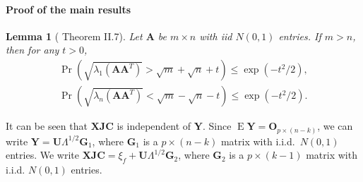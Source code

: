 \documentclass[12pt]{article} %
\DeclareMathOperator{\myE}{E}
\newcommand{\bA}{\mathbf{A}}
\newcommand{\bX}{\mathbf{X}}
\newcommand{\bY}{\mathbf{Y}}
\newcommand{\bG}{\mathbf{G}}
\newcommand{\bJ}{\mathbf{J}}
\newcommand{\bC}{\mathbf{C}}
\newcommand{\bO}{\mathbf{O}}
\newcommand{\bU}{\mathbf{U}}
\newtheorem{lemma}{Lemma}
\theoremstyle{definition}
\begin{document}
\paragraph{Proof of the main results}
\begin{lemma}[\citet{DAVIDSON2001317} Theorem II.7]\label{DSbound}
    Let $\bA$ be $m\times n$ with iid $N(0,1)$ entries.
    If $m>n$, then for any $t>0$,
    \begin{align*}
        \Pr(\sqrt{\lambda_1(\bA \bA^T)}>\sqrt{m}+\sqrt{n}+t)\leq \exp(-t^2/2),\\
        \Pr(\sqrt{\lambda_n(\bA \bA^T)}<\sqrt{m}-\sqrt{n}-t)\leq \exp(-t^2/2).
    \end{align*}
\end{lemma}

It can be seen that $\bX\bJ\bC$ is independent of $\bY$.
Since
$
\myE \bY = \bO_{p\times (n-k)}
$,
we can write
$
\bY = \bU\Lambda^{1/2} \bG_1
$,
where $\bG_1$ is a $p\times (n-k)$ matrix with i.i.d.\ $N(0,1)$ entries.
We write
$
\bX\bJ\bC = \xi_f + \bU\Lambda^{1/2} \bG_2
$, 
where $\bG_2$ is a $p\times (k-1)$ matrix with i.i.d. $N(0,1)$ entries.
\end{document}
